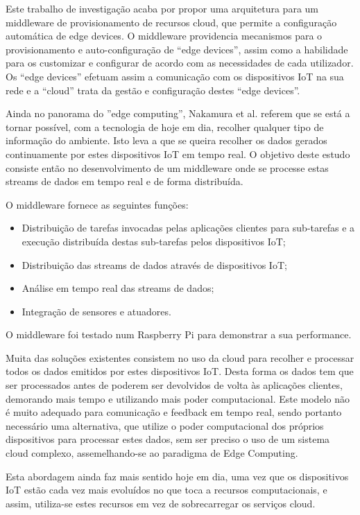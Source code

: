 Este trabalho de investigação acaba por propor uma arquitetura para um middleware de provisionamento de recursos cloud, que permite a configuração automática de edge devices. O middleware providencia mecanismos para o provisionamento e auto-configuração de “edge devices”, assim como a habilidade para os customizar e configurar de acordo com as necessidades de cada utilizador. Os “edge devices” efetuam assim a comunicação com os dispositivos IoT na sua rede e a “cloud” trata da gestão e configuração destes “edge devices”.


Ainda no panorama do ''edge computing'', Nakamura et al. \cite{iot-real-time} referem que se está a tornar possível, com a tecnologia de hoje em dia, recolher qualquer tipo de informação do ambiente. Isto leva a que se queira recolher os dados gerados continuamente por estes dispositivos IoT em tempo real. O objetivo deste estudo consiste então no desenvolvimento de um middleware onde se processe estas streams de dados em tempo real e de forma distribuída.

O middleware fornece as seguintes funções:
\begin{itemize}
\item Distribuição de tarefas invocadas pelas aplicações clientes para sub-tarefas e a execução distribuída destas sub-tarefas pelos dispositivos IoT;
\item Distribuição das streams de dados através de dispositivos IoT;
\item Análise em tempo real das streams de dados;
\item Integração de sensores e atuadores.
\end{itemize}

O middleware foi testado num Raspberry Pi para demonstrar a sua performance.

Muita das soluções existentes consistem no uso da cloud para recolher e processar todos os dados emitidos por estes dispositivos IoT. Desta forma os dados tem que ser processados antes de poderem ser devolvidos de volta às aplicações clientes, demorando mais tempo e utilizando mais poder computacional. Este modelo não é muito adequado para comunicação e feedback em tempo real, sendo portanto necessário uma alternativa, que utilize o poder computacional dos próprios dispositivos para processar estes dados, sem ser preciso o uso de um sistema cloud complexo, assemelhando-se ao paradigma de Edge Computing.

Esta abordagem ainda faz mais sentido hoje em dia, uma vez que os dispositivos IoT estão cada vez mais evoluídos no que toca a recursos computacionais, e assim, utiliza-se estes recursos em vez de sobrecarregar os serviços cloud.

